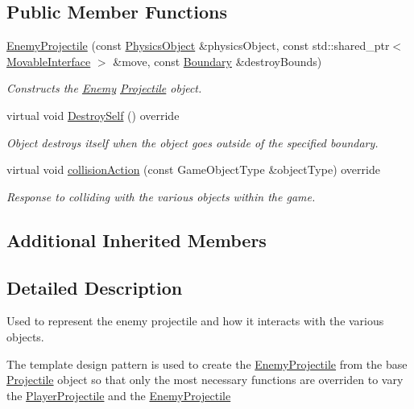 \subsection*{Public Member Functions}
\begin{DoxyCompactItemize}
\item 
\hyperlink{class_enemy_projectile_ab7040bb69b995ade3a18badb5486f0bb}{Enemy\+Projectile} (const \hyperlink{class_physics_object}{Physics\+Object} \&physics\+Object, const std\+::shared\+\_\+ptr$<$ \hyperlink{class_movable_interface}{Movable\+Interface} $>$ \&move, const \hyperlink{class_boundary}{Boundary} \&destroy\+Bounds)
\begin{DoxyCompactList}\small\item\em Constructs the \hyperlink{class_enemy}{Enemy} \hyperlink{class_projectile}{Projectile} object. \end{DoxyCompactList}\item 
\mbox{\label{class_enemy_projectile_a6ea9e3418fd05ca7ecee016019206f70}} 
virtual void \hyperlink{class_enemy_projectile_a6ea9e3418fd05ca7ecee016019206f70}{Destroy\+Self} () override
\begin{DoxyCompactList}\small\item\em Object destroys itself when the object goes outside of the specified boundary. \end{DoxyCompactList}\item 
virtual void \hyperlink{class_enemy_projectile_a4b3233a5ba7a3df66070cd6cdaa0362a}{collision\+Action} (const Game\+Object\+Type \&object\+Type) override
\begin{DoxyCompactList}\small\item\em Response to colliding with the various objects within the game. \end{DoxyCompactList}\end{DoxyCompactItemize}
\subsection*{Additional Inherited Members}


\subsection{Detailed Description}
Used to represent the enemy projectile and how it interacts with the various objects. 

The template design pattern is used to create the \hyperlink{class_enemy_projectile}{Enemy\+Projectile} from the base \hyperlink{class_projectile}{Projectile} object so that only the most necessary functions are overriden to vary the \hyperlink{class_player_projectile}{Player\+Projectile} and the \hyperlink{class_enemy_projectile}{Enemy\+Projectile} 


